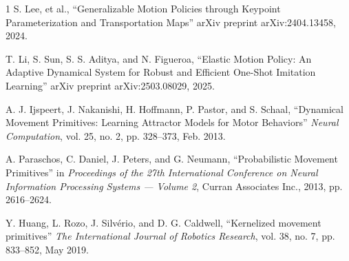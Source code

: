\documentclass[a4paper, 10pt, conference]{ieeeconf}
\begin{document}
\begin{thebibliography}{1}
    S. Lee, et al., ``Generalizable Motion Policies through Keypoint Parameterization and Transportation Maps'' arXiv preprint arXiv:2404.13458, 2024.

    T. Li, S. Sun, S. S. Aditya, and N. Figueroa, ``Elastic Motion Policy: An Adaptive Dynamical System for Robust and Efficient One-Shot Imitation Learning'' arXiv preprint arXiv:2503.08029, 2025.

    A. J. Ijspeert, J. Nakanishi, H. Hoffmann, P. Pastor, and S. Schaal, ``Dynamical Movement Primitives: Learning Attractor Models for Motor Behaviors'' \emph{Neural Computation}, vol. 25, no. 2, pp. 328--373, Feb. 2013.

    A. Paraschos, C. Daniel, J. Peters, and G. Neumann, ``Probabilistic Movement Primitives'' in \emph{Proceedings of the 27th International Conference on Neural Information Processing Systems --- Volume 2}, Curran Associates Inc., 2013, pp. 2616--2624.

    Y. Huang, L. Rozo, J. Silvério, and D. G. Caldwell, ``Kernelized movement primitives'' \emph{The International Journal of Robotics Research}, vol. 38, no. 7, pp. 833--852, May 2019.

\end{thebibliography}
\end{document}
